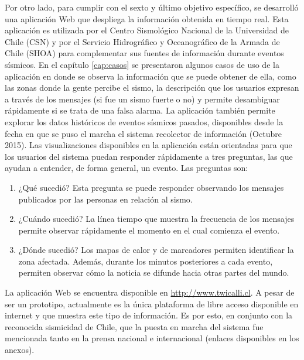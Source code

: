 \begin{conclusion}
Por otro lado, para cumplir con el sexto y último objetivo específico, se desarrolló una aplicación Web que despliega la información obtenida en tiempo real. Esta aplicación es utilizada por el Centro Sismológico Nacional de la Universidad de Chile (CSN) y por el Servicio Hidrográfico y Oceanográfico de la Armada de Chile (SHOA) para complementar sus fuentes de información durante eventos sísmicos. 
En el capítulo \ref{cap:casos} se presentaron algunos casos de uso de la aplicación en donde se observa la información que se puede obtener de ella, como las zonas donde la gente percibe el sismo, la descripción que los usuarios expresan a través de los mensajes (si fue un sismo fuerte o no) y permite desambiguar rápidamente si se trata de una falsa alarma.
%
La aplicación también permite explorar los datos históricos de eventos sísmicos pasados, disponibles desde la fecha en que se puso el marcha el sistema recolector de información (Octubre 2015). Las visualizaciones disponibles en la aplicación están orientadas para que los usuarios del sistema puedan responder rápidamente a tres preguntas, las que ayudan a entender, de forma general, un evento. Las preguntas son: 
\begin{enumerate}
\item ¿Qué sucedió? Esta pregunta se puede responder observando los mensajes publicados por las personas en relación al sismo.
\item ¿Cuándo sucedió? La línea tiempo que muestra la frecuencia de los mensajes permite observar rápidamente el momento en el cual comienza el evento. 
\item ¿Dónde sucedió? Los mapas de calor y de marcadores permiten identificar la zona afectada. Además, durante los minutos posteriores a cada evento, permiten observar cómo la noticia se difunde hacia otras partes del mundo.
\end{enumerate} 

La aplicación Web se encuentra disponible en \url{http://www.twicalli.cl}.
%
A pesar de ser un prototipo, actualmente es la única plataforma de libre acceso disponible en internet y que muestra este tipo de información. 
%
Es por esto, en conjunto con la reconocida sismicidad de Chile, que la puesta en marcha del sistema fue mencionada tanto en la prensa nacional e internacional (enlaces disponibles en los anexos). 



\end{conclusion}
